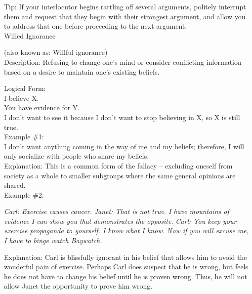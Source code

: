 \documentclass[a4paper,12pt,single,pdftex]{scrbook}
\begin{document}
    
      Tip: If your interlocutor begins rattling off several arguments,  politely interrupt them and request that they begin with their strongest argument, and allow you to address that one before proceeding to the next argument.
    \\

  

Willed Ignorance
    
      (also known as: Willful ignorance)
    \\

  
    Description: Refusing to change one’s mind or consider conflicting information based on a desire to maintain one's existing beliefs.

    
      Logical Form:
    \\

    
      I believe X.
    \\

    
      You have evidence for Y.
    \\

    
      I don’t want to see it because I don't want to stop believing in X, so X is still true.
    \\

    
      Example \#1:
    \\

    
      I don’t want anything coming in the way of me and my beliefs; therefore, I will only socialize with people who share my beliefs.
    \\

    
      Explanation: This is a common form of the fallacy -- excluding oneself from society as a whole to smaller subgroups where the same general opinions are shared.
    \\

    Example \#2:

    
      
    
    
      {\em Carl: Exercise causes cancer.} \newline
{\em Janet: That is not true. I have mountains of evidence I can show you that demonstrates the opposite.} \newline
{\em Carl: You keep your exercise propaganda to yourself. I know what I know. Now if you will excuse me, I have to binge watch Baywatch.}
    
    
      
    
    
      Explanation: Carl is blissfully ignorant in his belief that allows him to avoid the wonderful pain of exercise. Perhaps Carl does suspect that he is wrong, but feels he does not have to change his belief until he is proven wrong. Thus, he will not allow Janet the opportunity to prove him wrong.
    
\end{document}
